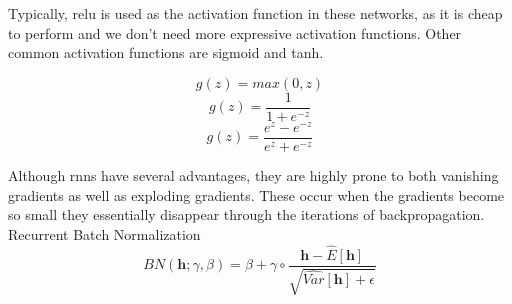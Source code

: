 Typically, \acrshort{relu} is used as the activation function in these networks, as it is cheap to perform and we don't need more expressive activation functions. Other common activation functions are sigmoid and tanh. 

$$g(z) = max(0, z)$$
$$g(z) = \frac{1}{1 + e^{-z}}$$
$$g(z) = \frac{e^z - e^{-z}}{e^z + e^{-z}}$$

Although \acrshort{rnn}s have several advantages, they are highly prone to both vanishing gradients as well as exploding gradients. These occur when the gradients become so small they essentially disappear through the iterations of backpropagation. \\ 



Recurrent Batch Normalization
\begin{equation} \label{eq:bnrnn}
    BN(\textbf{h}; \gamma, \beta) = \beta + \gamma \circ \frac{
    \textbf{h} - \hat{E}[\textbf{h}]
    }{
    \sqrt{\hat{Var} [\textbf{h}] + \epsilon}
    }
\end{equation}
